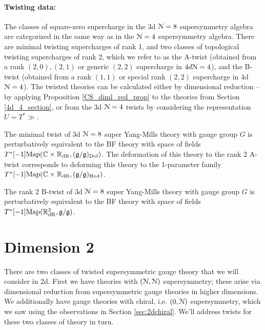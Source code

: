 \documentclass[10pt, oneside]{article}
\begin{document}
\vspace{-10pt}
\paragraph{Twisting data:}
The classes of square-zero supercharge in the 3d $\mathcal{N}=8$ supersymmetry algebra are categorized in the same way as in the $\mathcal{N}=4$ supersymmetry algebra.  There are minimal twisting supercharges of rank 1, and two classes of topological twisting supercharges of rank 2, which we refer to as the A-twist (obtained from a rank $(2,0), (2,1)$ or generic $(2,2)$ supercharge in $4d \mathcal{N}=4$), and the B-twist (obtained from a rank $(1,1)$ or special rank $(2,2)$ supercharge in 4d $\mathcal{N}=4$).  The twisted theories can be calculated either by dimensional reduction -- by applying Proposition \ref{CS_diml_red_prop} to the theories from Section \ref{4d_4_section}, or from the 3d $\mathcal{N}=4$ twists by considering the representation $U = T^*\gg$.

\begin{theorem} 
The minimal twist of 3d $\mathcal{N}=8$ super Yang-Mills theory with gauge group $G$ is perturbatively equivalent to the BF theory with space of fields $T^*[-1]\mathrm{Map}(\mathbb C \times \mathbb R_{\mathrm{dR}}, (\mathfrak{g}/\mathfrak{g})_{\mathrm{Dol}})$. The deformation of this theory to the rank 2 A-twist corresponds to deforming this theory to the 1-parameter family $T^*[-1]\mathrm{Map}(\mathbb C \times \mathbb R_{\mathrm{dR}}, (\mathfrak{g}/\mathfrak{g})_{\mathrm{Hod}})$.
\end{theorem}

\begin{theorem} 
The rank $2$ B-twist of 3d $\mathcal{N}=8$ super Yang-Mills theory with gauge group $G$ is perturbatively equivalent to the BF theory with space of fields $T^*[-1]\mathrm{Map}(\mathbb R^3_{\mathrm{dR}}, \mathfrak{g}/\mathfrak{g})$. 
\end{theorem}

\section{Dimension 2}

There are two classes of twisted supersymmetric gauge theory that we will consider in 2d.  First we have theories with $(\mathcal{N}, \mathcal{N})$ supersymmetry; these arise via dimensional reduction from supersymmetric gauge theories in higher dimensions.  We additionally have gauge theories with chiral, i.e. $(0,\mathcal{N})$ supersymmetry, which we saw using the observations in Section \ref{sec:2dchiral}.  We'll address twists for these two classes of theory in turn.
\end{document}
